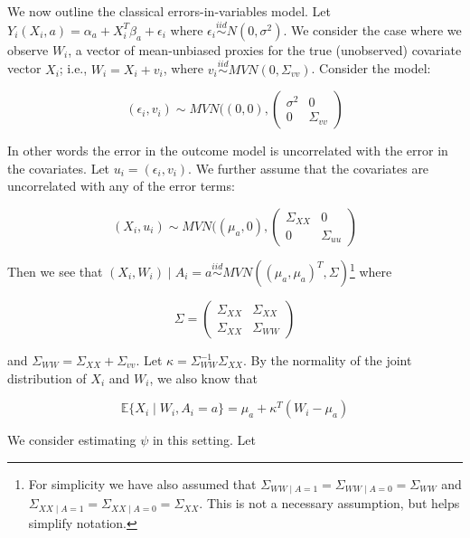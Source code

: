 We now outline the classical errors-in-variables model. Let $Y_i(X_i, a) = \alpha_a + X_i^T\beta_a + \epsilon_i$ where $\epsilon_i \stackrel{iid}\sim N(0, \sigma^2)$. We consider the case where we observe $W_i$, a vector of mean-unbiased proxies for the true (unobserved) covariate vector $X_i$; i.e., $W_i = X_i + v_i$, where $v_i \stackrel{iid}\sim MVN(0, \Sigma_{vv})$. Consider the model:

\begin{equation}
(\epsilon_i, v_i) \sim MVN((0, 0), \begin{pmatrix} 
\sigma^2 & 0 \\ 
0 & \Sigma_{vv}  
\end{pmatrix}
\end{equation}

In other words the error in the outcome model is uncorrelated with the error in the covariates. Let $u_i = (\epsilon_i, v_i)$. We further assume that the covariates are uncorrelated with any of the error terms:

\begin{equation}
(X_i, u_i) \sim MVN((\mu_a, 0), \begin{pmatrix} 
\Sigma_{XX} & 0 \\ 
0 & \Sigma_{uu}  
\end{pmatrix}
\end{equation}

Then we see that $(X_i, W_i) \mid A_i = a \stackrel{iid}{\sim} MVN((\mu_a, \mu_a)^T, \Sigma)$\footnote{For simplicity we have also assumed that $\Sigma_{WW \mid A = 1} = \Sigma_{WW \mid A = 0} = \Sigma_{WW}$ and $\Sigma_{XX \mid A = 1} = \Sigma_{XX \mid A = 0} = \Sigma_{XX}$. This is not a necessary assumption, but helps simplify notation.} where 

$$
\Sigma = \begin{pmatrix} 
\Sigma_{XX} & \Sigma_{XX} \\ 
\Sigma_{XX} & \Sigma_{WW}  
\end{pmatrix}
$$ 

and $\Sigma_{WW} = \Sigma_{XX} + \Sigma_{vv}$. Let $\kappa = \Sigma_{WW}^{-1}\Sigma_{XX}$. By the normality of the joint distribution of $X_i$ and $W_i$, we also know that

\begin{equation}
\mathbb{E}\{X_i \mid W_i, A_i = a\} = \mu_a + \kappa^T(W_i - \mu_a)
\end{equation}

We consider estimating $\psi$ in this setting. Let 

